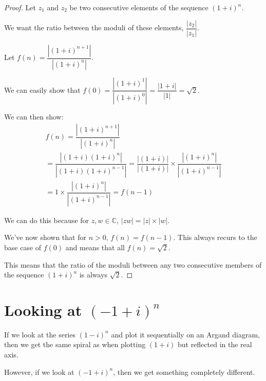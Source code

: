 \documentclass[a4paper]{article}
\newcommand{\abs}[1]{\left| #1 \right|}
\newcommand{\opi}{(1 + i)}
\newcommand{\mopi}{(-1 + i)}
\begin{document}
\begin{proof}
Let $z_1$ and $z_2$ be two consecutive elements of the sequence $\opi^n$.

We want the ratio between the moduli of these elements, $\dfrac{\abs{z_2}}{\abs{z_1}}$.

Let $f(n) = \dfrac{\abs{\opi^{n + 1}}}{\abs{\opi^n}}$.

We can easily show that $f(0) = \dfrac{\abs{\opi^1}}{\abs{\opi^0}} = \dfrac{\abs{1 + i}}{\abs{1}} = \sqrt{2}$.

We can then show:
\begin{gather*}
f(n) = \dfrac{\abs{\opi^{n + 1}}}{\abs{\opi^n}}\\[0.5em]
= \dfrac{\abs{\opi\opi^n}}{\abs{\opi\opi^{n - 1}}} = \dfrac{\abs{\opi}}{\abs{\opi}} \times \dfrac{\abs{\opi^n}}{\abs{\opi^{n - 1}}}\\[0.5em]
= 1 \times \dfrac{\abs{\opi^n}}{\abs{\opi^{n - 1}}} = f(n - 1)
\end{gather*}

We can do this because for $z, w \in \mathbb{C}$, $\abs{zw} = \abs{z} \times \abs{w}$.

We've now shown that for $n > 0$, $f(n) = f(n - 1)$. This always recurs to the base case of $f(0)$ and means that all $f(n) = \sqrt{2}$.

This means that the ratio of the moduli between any two consecutive members of the sequence $\opi^n$ is always $\sqrt{2}$.
\end{proof}

\newpage

\section{Looking at $\mopi^n$}

If we look at the series $(1 - i)^n$ and plot it sequentially on an Argand diagram, then we get the same spiral as when plotting $\opi$ but reflected in the real axis.

However, if we look at $\mopi^n$, then we get something completely different.

\begin{center}
\end{center}
\end{document}
